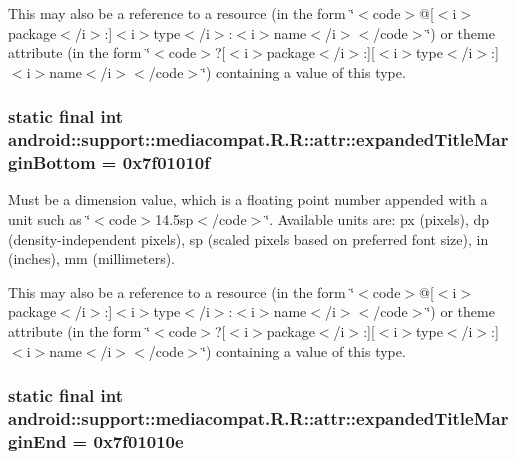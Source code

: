 This may also be a reference to a resource (in the form \char`\"{}$<$code$>$@\mbox{[}$<$i$>$package$<$/i$>$:\mbox{]}$<$i$>$type$<$/i$>$:$<$i$>$name$<$/i$>$$<$/code$>$\char`\"{}) or theme attribute (in the form \char`\"{}$<$code$>$?\mbox{[}$<$i$>$package$<$/i$>$:\mbox{]}\mbox{[}$<$i$>$type$<$/i$>$:\mbox{]}$<$i$>$name$<$/i$>$$<$/code$>$\char`\"{}) containing a value of this type. \hypertarget{classandroid_1_1support_1_1mediacompat_1_1_r_1_1attr_392f3a1df805af23c1566042c9805ac5}{
\subsubsection[{expandedTitleMarginBottom}]{\setlength{\rightskip}{0pt plus 5cm}static final int android::support::mediacompat.R.R::attr::expandedTitleMarginBottom = 0x7f01010f}}
\label{classandroid_1_1support_1_1mediacompat_1_1_r_1_1attr_392f3a1df805af23c1566042c9805ac5}


Must be a dimension value, which is a floating point number appended with a unit such as \char`\"{}$<$code$>$14.5sp$<$/code$>$\char`\"{}. Available units are: px (pixels), dp (density-independent pixels), sp (scaled pixels based on preferred font size), in (inches), mm (millimeters). 

This may also be a reference to a resource (in the form \char`\"{}$<$code$>$@\mbox{[}$<$i$>$package$<$/i$>$:\mbox{]}$<$i$>$type$<$/i$>$:$<$i$>$name$<$/i$>$$<$/code$>$\char`\"{}) or theme attribute (in the form \char`\"{}$<$code$>$?\mbox{[}$<$i$>$package$<$/i$>$:\mbox{]}\mbox{[}$<$i$>$type$<$/i$>$:\mbox{]}$<$i$>$name$<$/i$>$$<$/code$>$\char`\"{}) containing a value of this type. \hypertarget{classandroid_1_1support_1_1mediacompat_1_1_r_1_1attr_6f8f0c92176fe4e9c87894da330e69e7}{
\subsubsection[{expandedTitleMarginEnd}]{\setlength{\rightskip}{0pt plus 5cm}static final int android::support::mediacompat.R.R::attr::expandedTitleMarginEnd = 0x7f01010e}}
\label{classandroid_1_1support_1_1mediacompat_1_1_r_1_1attr_6f8f0c92176fe4e9c87894da330e69e7}


